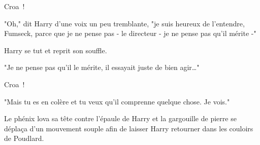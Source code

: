 Croa~!

"Oh," dit Harry d'une voix un peu tremblante, "je suis heureux de l'entendre, Fumseck, parce que je ne pense pas - le directeur - je ne pense pas qu'il mérite -"

Harry se tut et reprit son souffle.

"Je ne pense pas qu'il le mérite, il essayait juste de bien agir…"

Croa~!

"Mais tu es en colère et tu veux qu'il comprenne quelque chose. Je vois."

Le phénix lova sa tête contre l'épaule de Harry et la gargouille de pierre se déplaça d'un mouvement souple afin de laisser Harry retourner dans les couloirs de Poudlard. 

